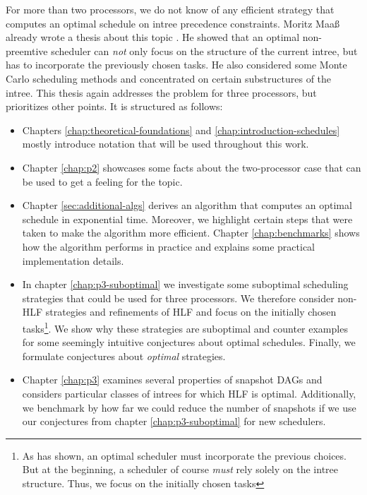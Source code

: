 For more than two processors, we do not know of any efficient strategy that computes an optimal schedule on intree precedence constraints. Moritz Maaß already wrote a thesis about this topic \cite{MoritzMaasDiploma}. He showed that an optimal non-preemtive scheduler can \emph{not} only focus on the structure of the current intree, but has to incorporate the previously chosen tasks. He also considered some Monte Carlo scheduling methods and concentrated on certain substructures of the intree. This thesis again addresses the problem for three processors, but prioritizes other points. It is structured as follows:

\begin{itemize}
\item Chapters \ref{chap:theoretical-foundations} and \ref{chap:introduction-schedules} mostly introduce notation that will be used throughout this work. 
\item Chapter \ref{chap:p2} showcases some facts about the two-processor case that can be used to get a feeling for the topic.
\item Chapter \ref{sec:additional-algs} derives an algorithm that computes an optimal schedule in exponential time. Moreover, we highlight certain steps that were taken to make the algorithm more efficient. Chapter \ref{chap:benchmarks} shows how the algorithm performs in practice and explains some practical implementation details.
\item In chapter \ref{chap:p3-suboptimal} we investigate some suboptimal scheduling strategies that could be used for three processors. We therefore consider non-HLF strategies and refinements of HLF and focus on the initially chosen tasks\footnote{As \cite{MoritzMaasDiploma} has shown, an optimal scheduler must incorporate the previous choices. But at the beginning, a scheduler of course \emph{must} rely solely on the intree structure. Thus, we focus on the initially chosen tasks}. We show why these strategies are suboptimal and counter examples for some seemingly intuitive conjectures about optimal schedules. Finally, we formulate conjectures about \emph{optimal} strategies.
\item Chapter \ref{chap:p3} examines several properties of snapshot DAGs and considers particular classes of intrees for which HLF is optimal. Additionally, we benchmark by how far we could reduce the number of snapshots if we use our conjectures from chapter \ref{chap:p3-suboptimal} for new schedulers.
\end{itemize}

